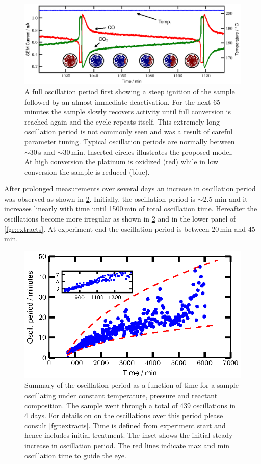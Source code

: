 \documentclass[journal=jacsat,manuscript=article]{achemso}
\begin{document}
\begin{figure}
  \includegraphics[width=16cm]{single_full_oscillation.eps}
  \caption{A full oscillation period first showing a steep ignition of the
  sample followed by an almost immediate deactivation. For the next 65 minutes
  the sample slowly recovers activity until full conversion is reached again
  and the cycle repeats itself. This extremely long oscillation period is not
  commonly seen and was a result of careful parameter tuning. Typical
  oscillation periods are normally between $\sim$30\,s and $\sim$30\,min.
  Inserted circles illustrates the proposed model. At high conversion the
  platinum is oxidized (red) while in low conversion the sample is reduced
  (blue).} \label{fgr:full_oscillation}
\end{figure}

After prolonged measurements over several days an increase in oscillation
period was observed as shown in \ref{fgr:long_measurement}. Initially, the
oscillation period is $\sim$2.5 min and it increases linearly with time until 1500\,min
of total oscillation time. Hereafter the oscillations become more irregular
as shown in \ref{fgr:long_measurement} and in the lower panel of \ref{fgr:extracts}. At
experiment end the oscillation period is between 20\,min and 45\,min.

\begin{figure}
  \includegraphics[width=12cm]{summary_of_long_measurement.eps}
  \caption{Summary of the oscillation period as a function of time for a sample
  oscillating under constant temperature, pressure and reactant composition.
  The sample went through a total of 439 oscillations in 4 days. For details on on
  the oscillations over this period please consult \ref{fgr:extracts}. Time is
  defined from experiment start and hence includes initial treatment. The inset
  shows the initial steady increase in oscillation period. The red lines indicate
  max and min oscillation time to guide the eye.}
  \label{fgr:long_measurement}
\end{figure}
  
\end{document}
